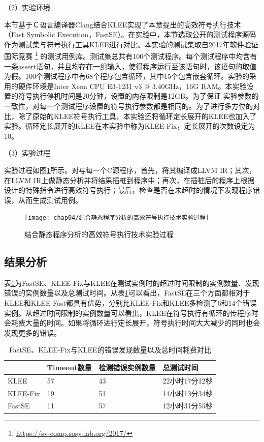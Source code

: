 （2）实验环境

本节基于Ｃ语言编译器Clang结合KLEE实现了本章提出的高效符号执行技术（Fast Symbolic Execution，FastSE）。在实验中，本节选取公开的测试程序源码作为测试集与符号执行工具KLEE进行对比。本实验的测试集取自2017年软件验证国际竞赛
\footnote{\url{https://sv-comp.sosy-lab.org/2017/}}
的测试用例库。测试集总共有100个测试程序。每个测试程序中均含有一条assert语句，并且均存在一组输入，使得程序运行至该语句时，该语句的取值为假。100个测试程序中有68个程序包含循环，其中15个包含嵌套循环。实验的采用的硬件环境是Inter Xeon CPU E3-1231 v3 @ 3.40GHz，16G RAM。本实验设置的符号执行停机时间是20分钟，设置的内存限制是12GB。为了保证
实验参数的一致性，对每一个测试程序设置的符号执行参数都是相同的。为了进行多方位的对比，除了原始的KLEE符号执行工具，本实验还将循环定长展开的KLEE也加入了实验。循环定长展开的KLEE在本实验中称为KLEE-Fix，定长展开的次数设定为10。

（3）实验过程

实验过程如图\ref{experiment_procedure}所示。对与每一个C源程序，首先，将其编译成LLVM IR；其次，在LLVM IR上做静态分析并将结果插桩到程序中；再次，在插桩后的程序上根据设计的特殊指令进行高效符号执行；最后，检查是否在未超时的情况下发现程序错误，从而生成测试用例。

\begin{figure}[h]
	\centering
	\texttt{[image: chap04/结合静态程序分析的高效符号执行技术实验过程]}
	\caption{结合静态程序分析的高效符号执行技术实验过程}
	\label{experiment_procedure}
\end{figure}

\subsection{结果分析}
表\ref{FastSE_KLEE-Fix与KLEE的发现错误数量以及总时间耗费对比}为FastSE、KLEE-Fix与KLEE在测试实例时的超过时间限制的实例数量、发现错误的实例数量以及总测试时间。从表\ref{FastSE_KLEE-Fix与KLEE的发现错误数量以及总时间耗费对比}可以看出，FastSE在三个方面都相对于KLEE和KLEE-Fast都具有优势，分别比KLEE-Fix和KLEE多检测了6和14个错误实例。从超过时间限制的实例数量可以看出，KLEE在符号执行有循环的传程序时会耗费大量的时间。如果将循环进行定长展开，符号执行时间大大减少的同时也会发现更多的错误。

\begin{table}[ht]
\begin{center}
\caption{FastSE、KLEE-Fix与KLEE的错误发现数量以及总时间耗费对比}
\label{FastSE_KLEE-Fix与KLEE的发现错误数量以及总时间耗费对比}
\begin{small}
\begin{tabular}{|l|l|l|l|}
\hline
{\bf } & {\bf Timeout数量} & {\bf 检测错误实例数量} & {\bf 总测试时间} \\
\hline
KLEE & 57 & 43 & 22小时17分12秒 \\
KLEE-Fix & 19 & 51 & 14小时13分34秒\\
FastSE & 11 & 57 & 12小时31分55秒\\
\hline
\end{tabular}
\end{small}
\end{center}
\end{table}

